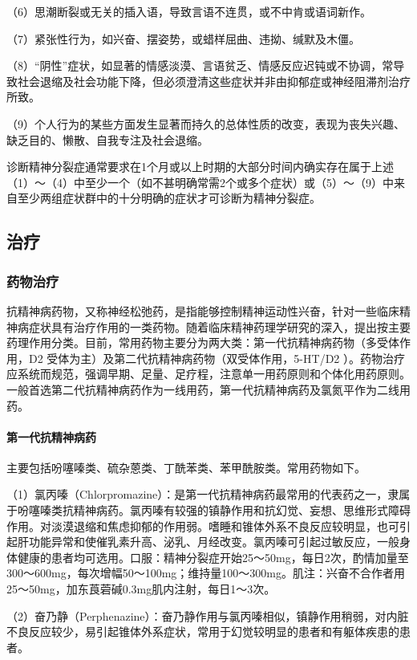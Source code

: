 （6）思潮断裂或无关的插入语，导致言语不连贯，或不中肯或语词新作。

（7）紧张性行为，如兴奋、摆姿势，或蜡样屈曲、违拗、缄默及木僵。

（8）“阴性”症状，如显著的情感淡漠、言语贫乏、情感反应迟钝或不协调，常导致社会退缩及社会功能下降，但必须澄清这些症状并非由抑郁症或神经阻滞剂治疗所致。

（9）个人行为的某些方面发生显著而持久的总体性质的改变，表现为丧失兴趣、缺乏目的、懒散、自我专注及社会退缩。

诊断精神分裂症通常要求在1个月或以上时期的大部分时间内确实存在属于上述（1）～（4）中至少一个（如不甚明确常需2个或多个症状）或（5）～（9）中来自至少两组症状群中的十分明确的症状才可诊断为精神分裂症。

\subsection{治疗}

\subsubsection{药物治疗}

抗精神病药物，又称神经松弛药，是指能够控制精神运动性兴奋，针对一些临床精神病症状具有治疗作用的一类药物。随着临床精神药理学研究的深入，提出按主要药理作用分类。目前，常用药物主要分为两大类：第一代抗精神病药物（多受体作用，D{2}
受体为主）及第二代抗精神病药物（双受体作用，5-HT/D{2}
）。药物治疗应系统而规范，强调早期、足量、足疗程，注意单一用药原则和个体化用药原则。一般首选第二代抗精神病药作为一线用药，第一代抗精神病药及氯氮平作为二线用药。
\paragraph{第一代抗精神病药}

主要包括吩噻嗪类、硫杂蒽类、丁酰苯类、苯甲酰胺类。常用药物如下。

（1）氯丙嗪（Chlorpromazine）：是第一代抗精神病药最常用的代表药之一，隶属于吩噻嗪类抗精神病药。氯丙嗪有较强的镇静作用和抗幻觉、妄想、思维形式障碍作用。对淡漠退缩和焦虑抑郁的作用弱。嗜睡和锥体外系不良反应较明显，也可引起肝功能异常和使催乳素升高、泌乳、月经改变。氯丙嗪可引起过敏反应，一般身体健康的患者均可选用。口服：精神分裂症开始25～50mg，每日2次，酌情加量至300～600mg，每次增幅50～100mg；维持量100～300mg。肌注：兴奋不合作者用25～50mg，加东莨菪碱0.3mg肌内注射，每日1～3次。

（2）奋乃静（Perphenazine）：奋乃静作用与氯丙嗪相似，镇静作用稍弱，对内脏不良反应较少，易引起锥体外系症状，常用于幻觉较明显的患者和有躯体疾患的患者。

